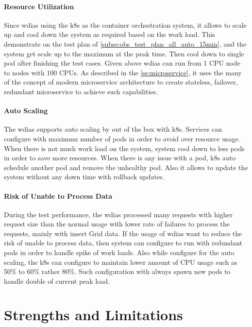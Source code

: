\documentclass[conference]{IEEEtran}
\begin{document}
\paragraph{Resource Utilization}
Since \acrshort{wdias} using the \acrshort{k8s} as the container orchestration system, it allows to scale up and cool down the system as required based on the work load. This demonstrate on the test plan of \ref{subse:obs_test_plan_all_auto_15min}, and the system get scale up to the maximum at the peak time. Then cool down to single pod after finishing the test cases.
Given above \acrshort{wdias} can run from 1 CPU node to nodes with 100 CPUs. As described in the \ref{se:microservice}, it uses the many of the concept of modern microservice architecture to create stateless, failover, redundant microservice to achieve such capabilities.

\paragraph{Auto Scaling}
The \acrshort{wdias} supports auto scaling by out of the box with \acrshort{k8s}. Services can configure with maximum number of pods in order to avoid over resource usage. When there is not much work load on the system, system cool down to less pods in order to save more resources. When there is any issue with a pod, \acrshort{k8s} auto schedule another pod and remove the unhealthy pod. Also it allows to update the system without any down time with rollback updates.

\paragraph{Risk of Unable to Process Data}
During the test performance, the \acrshort{wdias} processed many requests with higher request size than the normal usage with lower rate of failures to process the requests, mainly with insert Grid data. If the usage of \acrshort{wdias} want to reduce the risk of unable to process data, then system can configure to run with redundant pods in order to handle spike of work loads. Also while configure for the auto scaling, the \acrshort{k8s} can configure to maintain lower amount of CPU usage such as 50\% to 60\% rather 80\%. Such configuration with always spawn new pods to handle double of current peak load.

\section{Strengths and Limitations}
\end{document}
